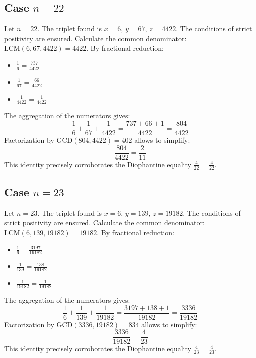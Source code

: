 \documentclass[11pt,a4paper]{article}
\begin{document}
\subsection{Case $n = 22$}
Let $n = 22$. The triplet found is $x = 6$, $y = 67$, $z = 4422$.
The conditions of strict positivity are ensured.
Calculate the common denominator: $\text{LCM}(6, 67, 4422) = 4422$.
By fractional reduction:
\begin{itemize}
    \item $\frac{1}{6} = \frac{737}{4422}$
    \item $\frac{1}{67} = \frac{66}{4422}$
    \item $\frac{1}{4422} = \frac{1}{4422}$
\end{itemize}
The aggregation of the numerators gives:
$$ \frac{1}{6} + \frac{1}{67} + \frac{1}{4422} = \frac{737 + 66 + 1}{4422} = \frac{804}{4422} $$
Factorization by $\text{GCD}(804, 4422) = 402$ allows to simplify:
$$ \frac{804}{4422} = \frac{2}{11} $$
This identity precisely corroborates the Diophantine equality $\frac{4}{22} = \frac{4}{22}$.

\subsection{Case $n = 23$}
Let $n = 23$. The triplet found is $x = 6$, $y = 139$, $z = 19182$.
The conditions of strict positivity are ensured.
Calculate the common denominator: $\text{LCM}(6, 139, 19182) = 19182$.
By fractional reduction:
\begin{itemize}
    \item $\frac{1}{6} = \frac{3197}{19182}$
    \item $\frac{1}{139} = \frac{138}{19182}$
    \item $\frac{1}{19182} = \frac{1}{19182}$
\end{itemize}
The aggregation of the numerators gives:
$$ \frac{1}{6} + \frac{1}{139} + \frac{1}{19182} = \frac{3197 + 138 + 1}{19182} = \frac{3336}{19182} $$
Factorization by $\text{GCD}(3336, 19182) = 834$ allows to simplify:
$$ \frac{3336}{19182} = \frac{4}{23} $$
This identity precisely corroborates the Diophantine equality $\frac{4}{23} = \frac{4}{23}$.
\end{document}
